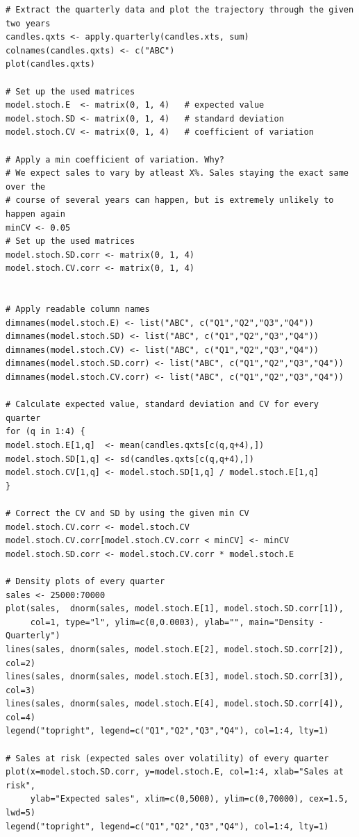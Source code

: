 \documentclass[a4paper,11pt]{article}
\begin{document}
\begin{lstlisting}
# Extract the quarterly data and plot the trajectory through the given two years
candles.qxts <- apply.quarterly(candles.xts, sum)
colnames(candles.qxts) <- c("ABC")
plot(candles.qxts)

# Set up the used matrices
model.stoch.E  <- matrix(0, 1, 4)   # expected value
model.stoch.SD <- matrix(0, 1, 4)   # standard deviation
model.stoch.CV <- matrix(0, 1, 4)   # coefficient of variation

# Apply a min coefficient of variation. Why?
# We expect sales to vary by atleast X%. Sales staying the exact same over the
# course of several years can happen, but is extremely unlikely to happen again
minCV <- 0.05
# Set up the used matrices
model.stoch.SD.corr <- matrix(0, 1, 4)
model.stoch.CV.corr <- matrix(0, 1, 4)


# Apply readable column names
dimnames(model.stoch.E) <- list("ABC", c("Q1","Q2","Q3","Q4"))
dimnames(model.stoch.SD) <- list("ABC", c("Q1","Q2","Q3","Q4"))
dimnames(model.stoch.CV) <- list("ABC", c("Q1","Q2","Q3","Q4"))
dimnames(model.stoch.SD.corr) <- list("ABC", c("Q1","Q2","Q3","Q4"))
dimnames(model.stoch.CV.corr) <- list("ABC", c("Q1","Q2","Q3","Q4"))

# Calculate expected value, standard deviation and CV for every quarter
for (q in 1:4) {
model.stoch.E[1,q]  <- mean(candles.qxts[c(q,q+4),])
model.stoch.SD[1,q] <- sd(candles.qxts[c(q,q+4),])
model.stoch.CV[1,q] <- model.stoch.SD[1,q] / model.stoch.E[1,q]
}

# Correct the CV and SD by using the given min CV
model.stoch.CV.corr <- model.stoch.CV
model.stoch.CV.corr[model.stoch.CV.corr < minCV] <- minCV
model.stoch.SD.corr <- model.stoch.CV.corr * model.stoch.E

# Density plots of every quarter
sales <- 25000:70000
plot(sales,  dnorm(sales, model.stoch.E[1], model.stoch.SD.corr[1]),
     col=1, type="l", ylim=c(0,0.0003), ylab="", main="Density - Quarterly")
lines(sales, dnorm(sales, model.stoch.E[2], model.stoch.SD.corr[2]), col=2)
lines(sales, dnorm(sales, model.stoch.E[3], model.stoch.SD.corr[3]), col=3)
lines(sales, dnorm(sales, model.stoch.E[4], model.stoch.SD.corr[4]), col=4)
legend("topright", legend=c("Q1","Q2","Q3","Q4"), col=1:4, lty=1)

# Sales at risk (expected sales over volatility) of every quarter
plot(x=model.stoch.SD.corr, y=model.stoch.E, col=1:4, xlab="Sales at risk",
     ylab="Expected sales", xlim=c(0,5000), ylim=c(0,70000), cex=1.5, lwd=5)
legend("topright", legend=c("Q1","Q2","Q3","Q4"), col=1:4, lty=1)


\end{lstlisting}
\end{document}
